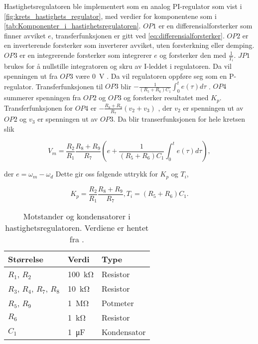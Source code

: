 Hastighetsregulatoren ble implementert som en analog PI-regulator som vist i \autoref{fig:krets_hastighets_regulator}, med verdier for komponentene som i \autoref{tab:Komponenter_i_hastighetsregulatoren}. $OP1$ er en differensialforsterker som finner avviket $e$, transferfunksjonen er gitt ved \eqref{eq:differensialforsterker}.
$OP2$ er en inverterende forsterker som inverterer avviket, uten forsterkning eller demping.
$OP3$ er en integrerende forsterker som integrerer $e$ og forsterker den med $\frac{1}{T_i}$.
$JP1$ brukes for å nullstille integratoren og skru av I-leddet i regulatoren.
Da vil spenningen ut fra $OP3$ være \SI{0}{\volt} \cite{AnalogMotorlabbOppgaver}.
Da vil regulatoren oppføre seg som en P-regulator.
Transferfunksjonen til $OP3$ blir $-\frac{1}{(R_5 + R_6) C_1} \int^t_0 e(\tau) d\tau$ \cite{Johnson}.
$OP4$ summerer spenningen fra $OP2$ og $OP3$ og forsterker resultatet med $K_p$.
Transferfunksjonen for $OP4$ er $-\frac{R_8 + R_9}{R_7}(v_2 + v_3)$ \cite{Johnson}, der $v_2$ er spenningen ut av $OP2$ og $v_3$ er spenningen ut av $OP3$. 
Da blir transerfunksjonen for hele kretsen slik

\begin{equation}
    \label{eq:hastighet_regulator_transferfuksjon}
    V_m =
    \frac{R_2}{R_1} \frac{R_8 + R_9}{R_7} \left(e + \frac{1}{(R_5 + R_6) C_1} \int^t_0 e(\tau) d\tau \right),
\end{equation}

der $e = \omega_m - \omega_d$
Dette gir oss følgende uttrykk for $K_p$ og $T_i$,

\begin{equation}
    \label{eq:K_p_og_T_i}
    K_p = \frac{R_2}{R_1} \frac{R_8 + R_9}{R_7}, 
    T_i = (R_5 + R_6) C_1.
\end{equation}

\begin{table}[h]
    \centering
    \caption{Motstander og kondensatorer i hastighetsregulatoren. Verdiene er hentet fra \cite{AnalogMotorlabbOppgaver}.}
    \begin{tabular}{lll}
        \toprule
        Størrelse & Verdi & Type \\
		\midrule
        $R_1$, $R_2$ & \SI{100}{\kilo\ohm} & Resistor\\
        $R_3$, $R_4$, $R_7$, $R_8$ & \SI{10}{\kilo\ohm} & Resistor \\
        $R_5$, $R_9$ & \SI{1}{\mega\ohm} & Potmeter \\
        $R_6$ & \SI{1}{\kilo\ohm} & Resistor \\
        $C_1$ & \SI{1}{\micro\farad} & Kondensator \\
        \bottomrule
    \end{tabular}
    \label{tab:Komponenter_i_hastighetsregulatoren}
\end{table}






